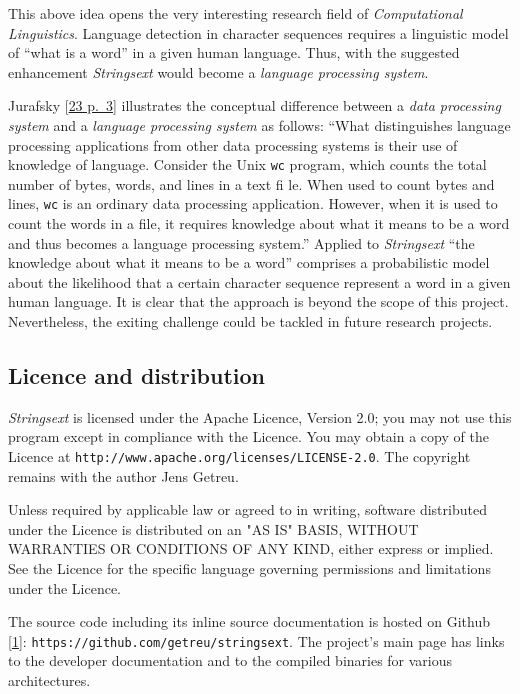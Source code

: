 This above idea opens the very interesting research field of
\emph{Computational Linguistics}. Language detection in character
sequences requires a linguistic model of ``what is a word'' in a given
human language. Thus, with the suggested enhancement \emph{Strings­ext}
would become a \emph{language processing system}.

Jurafsky {[}\protect\hyperlink{jurafsky2014}{23 p.~3}{]} illustrates the
conceptual difference between a \emph{data processing system} and a
\emph{language processing system} as follows: ``What distinguishes
language processing applications from other data processing systems is
their use of knowledge of language. Consider the Unix \texttt{wc}
program, which counts the total number of bytes, words, and lines in a
text fi le. When used to count bytes and lines, \texttt{wc} is an
ordinary data processing application. However, when it is used to count
the words in a file, it requires knowledge about what it means to be a
word and thus becomes a language processing system.'' Applied to
\emph{Strings­ext} ``the knowledge about what it means to be a word''
comprises a probabilistic model about the likelihood that a certain
character sequence represent a word in a given human language. It is
clear that the approach is beyond the scope of this project.
Nevertheless, the exiting challenge could be tackled in future research
projects.

\subsection{Licence and distribution}\label{_licence_and_distribution}

\emph{Strings­ext} is licensed under the Apache Licence, Version 2.0;
you may not use this program except in compliance with the Licence. You
may obtain a copy of the Licence at
\texttt{http://www.apache.org/licenses/LICENSE-2.0}. The copyright
remains with the author Jens Getreu.

Unless required by applicable law or agreed to in writing, software
dis­tri­bu­ted under the Licence is distributed on an "AS IS" BASIS,
WITHOUT WARRANTIES OR CONDITIONS OF ANY KIND, either express or implied.
See the Licence for the specific language governing permissions and
limitations under the Licence.

The source code including its inline source documentation is hosted on
Github {[}\protect\hyperlink{getreu2016}{1}{]}:
\texttt{https://github.com/getreu/stringsext}. The project's main page
has links to the developer documentation and to the compiled binaries
for various architectures.

